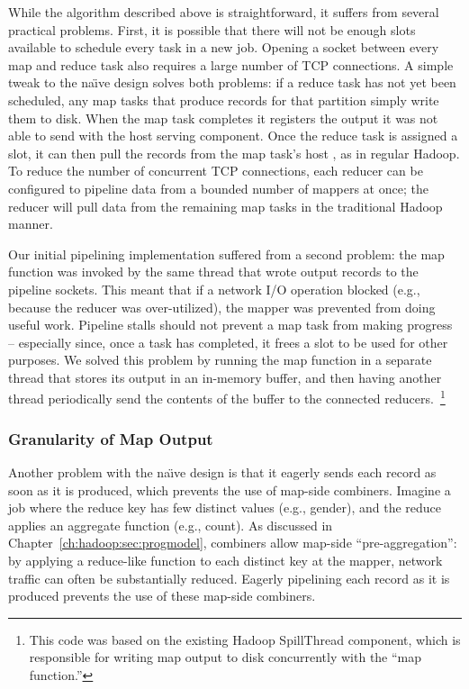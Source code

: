 While the algorithm described above is straightforward, it suffers from several
practical problems.  First, it is possible that there will not be enough slots
available to schedule every task in a new job.  Opening a socket between every
map and reduce task also requires a large number of TCP connections.  A simple
tweak to the na\"{\i}ve design solves both problems: if a reduce task has not
yet been scheduled, any map tasks that produce records for that partition
simply write them to disk.  When the map task completes it registers the output
it was not able to send with the host \TT serving component.  Once the reduce
task is assigned a slot, it can then pull the records from the map task's host
\TT, as in regular Hadoop.  To reduce the number of concurrent TCP connections,
each reducer can be configured to pipeline data from a bounded number of
mappers at once; the reducer will pull data from the remaining map tasks in the
traditional Hadoop manner.

Our initial pipelining implementation suffered from a second problem: the map
function was invoked by the same thread that wrote output records to the
pipeline sockets.  This meant that if a network I/O operation blocked (e.g.,
because the reducer was over-utilized), the mapper was prevented from doing
useful work.  Pipeline stalls should not prevent a map task from making
progress -- especially since, once a task has completed, it frees a {\TT} slot
to be used for other purposes.  We solved this problem by running the map
function in a separate thread that stores its output in an in-memory buffer,
and then having another thread periodically send the contents of the buffer to
the connected reducers.~\footnote{This code was based on the existing Hadoop
SpillThread component, which is responsible for writing map output to disk
concurrently with the ``map function.''}

\subsubsection{Granularity of Map Output}
\label{ch:hop:sec:mapout}

Another problem with the na\"{\i}ve design is that it eagerly sends each record
as soon as it is produced, which prevents the use of map-side combiners.
Imagine a job where the reduce key has few distinct values (e.g., gender), and
the reduce applies an aggregate function (e.g., count).  As discussed in
Chapter~\ref{ch:hadoop:sec:progmodel}, combiners allow map-side
``pre-aggregation'': by applying a reduce-like function to each distinct key at
the mapper, network traffic can often be substantially reduced.  Eagerly
pipelining each record as it is produced prevents the use of these map-side
combiners.

